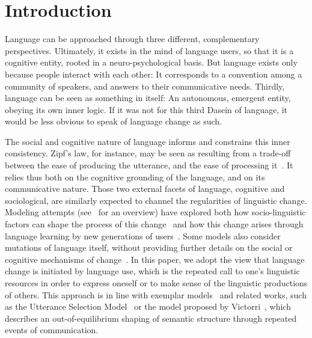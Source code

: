 \documentclass[12pt,twocolumn,amsmath,amssymb,aps,longbibliography]{revtex4-1}  %
\begin{document}
\maketitle 

\tableofcontents

\section*{Introduction}

Language can be approached through three different, complementary perspectives. Ultimately, it exists in the mind of language users, so that it is a cognitive entity, rooted in a neuro-psychological basis. But language exists only because people interact with each other: It corresponds to a convention among a community of speakers, and answers to their communicative needs. Thirdly, language can be seen as something in itself: An autonomous, emergent entity, obeying its own inner logic. If it was not for this third Dasein of language, it would be less obvious to speak of language change as such. 

The social and cognitive nature of language informs and constrains this inner consistency. Zipf's law, for instance, may be seen as resulting from a trade-off between the ease of producing the utterance, and the ease of processing it~\cite{i2003least}. It relies thus both on the cognitive grounding of the language, and on its communicative nature. Those two external facets of language, cognitive and sociological, are similarly expected to channel the regularities of linguistic change. Modeling attempts (see~\cite{feltgen2017modeling} for an overview) have explored both how socio-linguistic factors can shape the process of this change~\cite{loreto2011statistical,ke2008language} and how this change arises through language learning by new generations of users~\cite{nowak2002computational,griffiths2007language}. Some models also consider mutations of language itself, without providing further details on the social or cognitive mechanisms of change~\cite{yanovich2016genetic}. In this paper, we adopt the view that language change is initiated by language use, which is the repeated call to one's linguistic resources in order to express oneself or to make sense of the linguistic productions of others. This approach is in line with exemplar models~\cite{pierrehumbert2001lenition} and related works, such as the Utterance Selection Model~\cite{baxter2006utterance} or the model proposed by Victorri~\cite{victorri1994continuity}, 
which describes an out-of-equilibrium shaping of semantic structure through repeated events of communication. 
\end{document}

